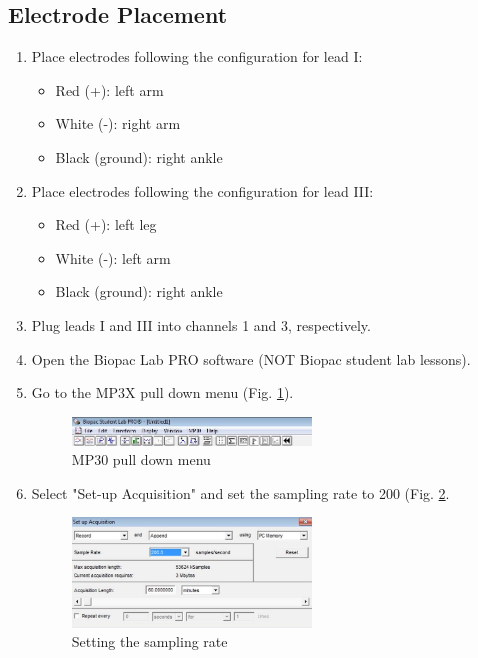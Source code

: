 \documentclass{article}
\begin{document}
\subsection*{Electrode Placement}
\begin{enumerate}
	\item Place electrodes following the configuration for lead I:\begin{itemize}
		\item Red (+): left arm
		\item White (-): right arm
		\item Black (ground): right ankle
	\end{itemize}
	
	\item Place electrodes following the configuration for lead III:\begin{itemize}
		\item Red (+): left leg
		\item White (-): left arm
		\item Black (ground): right ankle
	\end{itemize}
	
	\item Plug leads I and III into channels 1 and 3, respectively.
	\item Open the Biopac Lab PRO software (NOT Biopac student lab lessons).
	\item Go to the MP3X pull down menu (Fig. \ref{menu}).
		\begin{figure}[h]
	\centering\includegraphics[width=0.6\textwidth]{../images/ECG_II_4.jpg}
		\caption{MP30 pull down menu}
		\label{menu}
		\end{figure}
		
	\item Select "Set-up Acquisition" and set the sampling rate to 200 (Fig. \ref{menu_2}.
		\begin{figure}[h]
	\centering\includegraphics[width=0.6\textwidth]{../images/ECG_II_5.jpg}
		\caption{Setting the sampling rate}
		\label{menu_2}
		\end{figure}
		

\end{enumerate}
\end{document}
